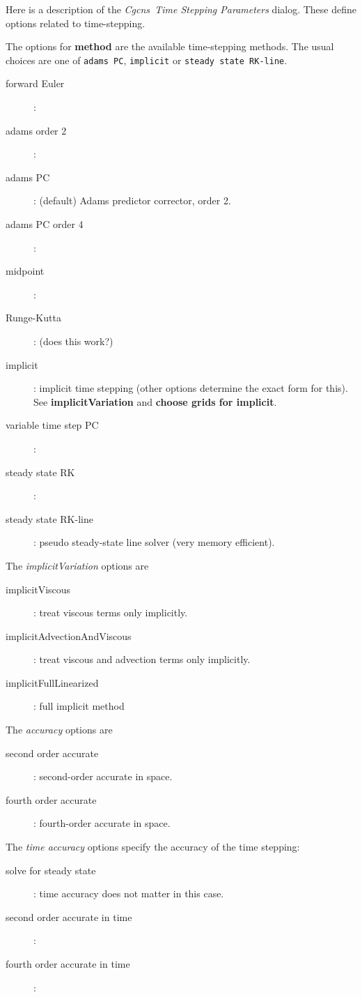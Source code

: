 \documentclass{article}
\newcommand{\Solver}{Cgcns}
\begin{document}
Here is a description of the {\em \Solver\ Time Stepping Parameters} dialog. These define options
related to time-stepping.

\noindent The options for {\bf method} are the available time-stepping methods. 
The usual choices are one of {\tt adams PC}, {\tt implicit} or {\tt steady state RK-line}. 
\begin{description}
  \item[\qquad forward Euler] :
  \item[\qquad adams order 2] :
  \item[\qquad adams PC] : (default) Adams predictor corrector, order 2.
  \item[\qquad adams PC order 4] :
  \item[\qquad midpoint] :
  \item[\qquad Runge-Kutta] : (does this work?)
  \item[\qquad implicit] : implicit time stepping (other options determine the exact form for this). 
             See {\bf implicitVariation} and {\bf choose grids for implicit}. 
  \item[\qquad variable time step PC] :
  \item[\qquad steady state RK] :
  \item[\qquad steady state RK-line] : pseudo steady-state line solver (very memory efficient). 
\end{description}


\noindent The {\em implicitVariation} options are
\begin{description}
  \item[\qquad implicitViscous] : treat viscous terms only implicitly. 
  \item[\qquad implicitAdvectionAndViscous] : treat viscous and advection terms only implicitly. 
  \item[\qquad implicitFullLinearized] : full implicit method
\end{description}
      

\noindent The {\em accuracy} options are
\begin{description}
  \item[\qquad second order accurate] : second-order accurate in space.
  \item[\qquad fourth order accurate] : fourth-order accurate in space.
\end{description}


\noindent The {\em time accuracy} options specify the accuracy of the time stepping:
\begin{description}
  \item[\qquad solve for steady state] : time accuracy does not matter in this case. 
  \item[\qquad second order accurate in time ] : 
  \item[\qquad fourth order accurate in time ] : 
\end{description}
\end{document}
